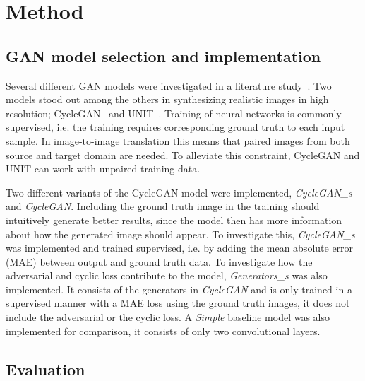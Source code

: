 \documentclass{article}
\begin{document}
\section{Method}

\subsection{GAN model selection and implementation}

Several different GAN models were investigated in a literature study~\cite{cycleGANs,VAECoupledGANs,StarGANs,GeneGANs,DualGANs}. Two models stood out among the others in synthesizing realistic images in high resolution; CycleGAN~\cite{cycleGANs} and UNIT~\cite{VAECoupledGANs}. Training of neural networks is commonly supervised, i.e. the training requires corresponding ground truth to each input sample. In image-to-image translation this means that paired images from both source and target domain are needed. To alleviate this constraint, CycleGAN and UNIT can work with unpaired training data.

Two different variants of the CycleGAN model were implemented, \emph{CycleGAN\_s} and \emph{CycleGAN}. Including the ground truth image in the training should intuitively generate better results, since the model then has more information about how the generated image should appear. To investigate this, \emph{CycleGAN\_s} was implemented and trained supervised, i.e. by adding the mean absolute error (MAE) between output and ground truth data. To investigate how the adversarial and cyclic loss contribute to the model, \emph{Generators\_s} was also implemented. It consists of the generators in \emph{CycleGAN} and is only trained in a supervised manner with a MAE loss using the ground truth images, it does not include the adversarial or the cyclic loss. A \emph{Simple} baseline model was also implemented for comparison, it consists of only two convolutional layers.

\subsection{Evaluation}
\end{document}
